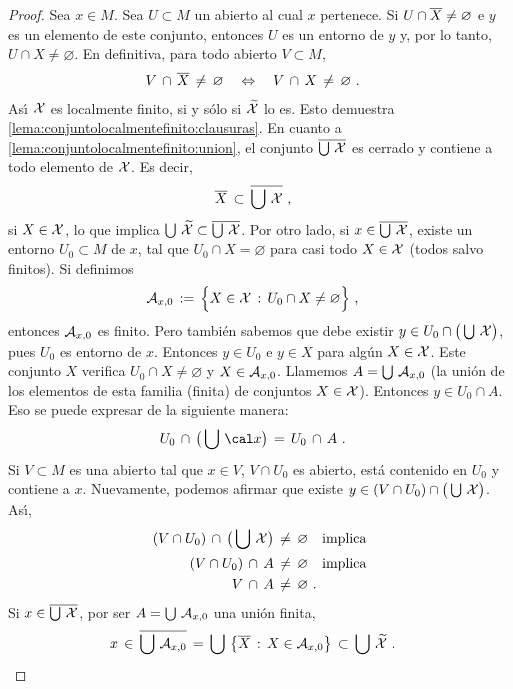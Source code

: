 \begin{proof}
	Sea $x\in M$. Sea $U\subset M$ un abierto al cual $x$ pertenece. Si
	$U\cap\clos X\not=\varnothing$ e $y$ es un elemento de este conjunto,
	entonces $U$ es un entorno de $y$ y, por lo tanto,
	$U\cap X\not=\varnothing$. En definitiva, para todo abierto
	$V\subset M$,
	\begin{align*}
		V\,\cap\,\clos X\,\not=\,\varnothing &
			\quad\Leftrightarrow\quad
		V\,\cap\,X\,\not=\,\varnothing
		\text{ .}
	\end{align*}
	As\'{\i} $\cal X$ es localmente finito, si y s\'{o}lo si
	$\widetilde{\cal X}$ lo es. Esto demuestra
	\ref{lema:conjuntolocalmentefinito:clausuras}. En cuanto a
	\ref{lema:conjuntolocalmentefinito:union}, el conjunto
	$\clos{\bigcup\,\cal X}$ es cerrado y contiene a todo elemento de
	$\cal X$. Es decir,
	\begin{align*}
		\clos X & \,\subset\,\clos{\bigcup\,\cal X}
		\text{ ,}
	\end{align*}
	si $X\in\cal X$, lo que implica
	\begin{math}
		\bigcup\,\widetilde{\cal X}\subset
			\clos{\bigcup\,\cal X}
	\end{math}. Por otro lado, si $x\in\clos{\bigcup\,\cal X}$, existe un
	entorno $U_0\subset M$ de $x$, tal que $U_0\cap X=\varnothing$ para
	casi todo $X\in\cal X$ (todos salvo finitos). Si definimos
	\begin{align*}
		\cal A_{x,0} & \,:=\,\Big\{X\in\cal X\,:\,
			U_0\cap X\not=\varnothing\Big\}
		\text{ ,}
	\end{align*}
	entonces $\cal A_{x,0}$ es finito. Pero tambi\'{e}n sabemos que debe
	existir $y\in U_0\cap \big(\bigcup\,\cal X\big)$, pues $U_0$ es entorno
	de $x$. Entonces $y\in U_0$ e $y\in X$ para alg\'{u}n $X\in\cal X$.
	Este conjunto $X$ verifica $U_0\cap X\not=\varnothing$ y
	$X\in\cal A_{x,0}$.
	Llamemos $A=\bigcup\,\cal A_{x,0}$ (la uni\'{o}n de los elementos de
	esta familia (finita) de conjuntos $X\in\cal X$). Entonces
	$y\in U_0\cap A$. Eso se puede expresar de la siguiente manera:
	\begin{align*}
		U_0\,\cap\,\big(\bigcup\,\cal x\big) & \,=\,
			U_0\,\cap\,A
		\text{ .}
	\end{align*}
	Si $V\subset M$ es una abierto tal que $x\in V$, $V\cap U_0$ es
	abierto, est\'{a} contenido en $U_0$ y contiene a $x$. Nuevamente,
	podemos afirmar que existe
	$y\in (V\cap U_0)\cap\big(\bigcup\,\cal X\big)$. As\'{\i},
	\begin{align*}
		(V\cap U_0)\,\cap\,\big(\bigcup\,\cal X\big) & \,\not=\,
			\varnothing \quad\text{implica} \\
		(V\cap U_0)\,\cap\,A & \,\not=\,\varnothing
			\quad\text{implica} \\
		V\,\cap\,A & \,\not=\,\varnothing
		\text{ .}
	\end{align*}
	Si $x\in\clos{\bigcup\,\cal X}$, por ser $A=\bigcup\,\cal A_{x,0}$ una
	uni\'{o}n finita,
	\begin{align*}
		x & \,\in\,\clos{\bigcup\,\cal A_{x,0}} \,=\,
			\bigcup\,\big\{\clos X\,:\,X\in\cal A_{x,0}\big\}
			\,\subset\,\bigcup\,\widetilde{\cal X}
		\text{ .}
	\end{align*}
\end{proof}

